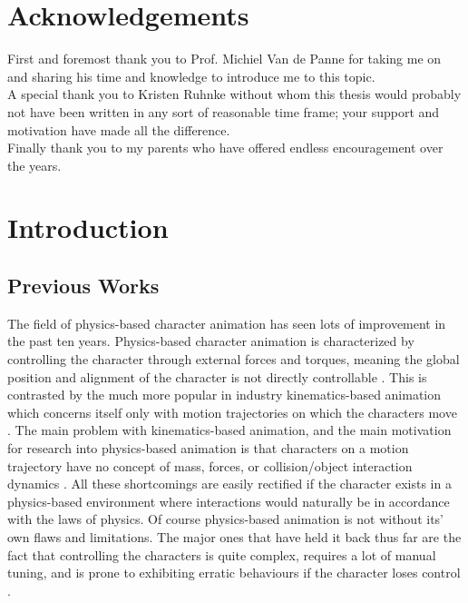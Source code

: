 \documentclass[12pt, a4paper]{article}
\begin{document}
\section*{Acknowledgements}
First and foremost thank you to Prof. Michiel Van de Panne for taking me on and sharing his time and knowledge to introduce me to this topic.\\

A special thank you to Kristen Ruhnke without whom this thesis would probably not have been written in any sort of reasonable time frame; your support and motivation have made all the difference.\\

Finally thank you to my parents who have offered endless encouragement over the years.
\newpage

\tableofcontents
\newpage
\listoffigures
\newpage
\listoftables

\newpage
\section{Introduction}

\subsection{Previous Works}

The field of physics-based character animation has seen lots of improvement in the past ten years. Physics-based character animation is characterized by controlling the character through external forces and torques, meaning the global position and alignment of the character is not directly controllable \cite{Geijtenbeek}. This is contrasted by the much more popular in industry kinematics-based animation which concerns itself only with motion trajectories on which the characters move \cite{walking_survey}. The main problem with kinematics-based animation, and the main motivation for research into physics-based animation is that characters on a motion trajectory have no concept of mass, forces, or collision/object interaction dynamics \cite{walking_survey}. All these shortcomings are easily rectified if the character exists in a physics-based environment where interactions would naturally be in accordance with the laws of physics. Of course physics-based animation is not without its' own flaws and limitations. The major ones that have held it back thus far are the fact that controlling the characters is quite complex, requires a lot of manual tuning, and is prone to exhibiting erratic behaviours if the character loses control \cite{Geijtenbeek}. \\
\end{document}
